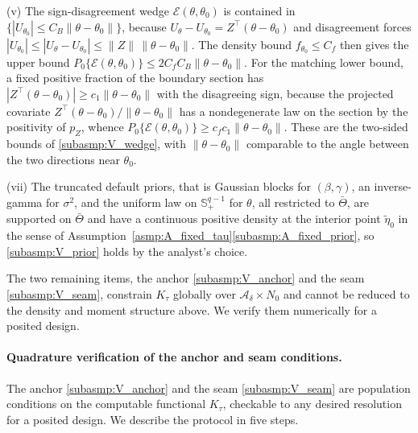 \documentclass[11pt]{article}
\theoremstyle{definition}
\theoremstyle{plain}
\begin{document}
(v) The sign-disagreement wedge $\mathcal E(\theta,\theta_0)$ is contained in $\{|U_{\theta_0}|\le C_B\|\theta-\theta_0\|\}$, because $U_\theta-U_{\theta_0}=Z^\top(\theta-\theta_0)$ and disagreement forces $|U_{\theta_0}|\le|U_\theta-U_{\theta_0}|\le\|Z\|\,\|\theta-\theta_0\|$. The density bound $f_{\theta_0}\le C_f$ then gives the upper bound $P_0\{\mathcal E(\theta,\theta_0)\}\le 2C_fC_B\|\theta-\theta_0\|$. For the matching lower bound, a fixed positive fraction of the boundary section has $|Z^\top(\theta-\theta_0)|\ge c_1\|\theta-\theta_0\|$ with the disagreeing sign, because the projected covariate $Z^\top(\theta-\theta_0)/\|\theta-\theta_0\|$ has a nondegenerate law on the section by the positivity of $p_Z$, whence $P_0\{\mathcal E(\theta,\theta_0)\}\ge c_f c_1\|\theta-\theta_0\|$. These are the two-sided bounds of \ref{subasmp:V_wedge}, with $\|\theta-\theta_0\|$ comparable to the angle between the two directions near $\theta_0$.

(vii) The truncated default priors, that is Gaussian blocks for $(\beta,\gamma)$, an inverse-gamma for $\sigma^2$, and the uniform law on $\mathbb S^{q-1}_+$ for $\theta$, all restricted to $\bar\Theta$, are supported on $\bar\Theta$ and have a continuous positive density at the interior point $\tilde\eta_0$ in the sense of Assumption~\ref{asmp:A_fixed_tau}\ref{subasmp:A_fixed_prior}, so \ref{subasmp:V_prior} holds by the analyst's choice.

The two remaining items, the anchor \ref{subasmp:V_anchor} and the seam \ref{subasmp:V_seam}, constrain $K_\tau$ globally over $\mathcal A_\delta\times N_0$ and cannot be reduced to the density and moment structure above. We verify them numerically for a posited design.

\paragraph{Quadrature verification of the anchor and seam conditions.} The anchor \ref{subasmp:V_anchor} and the seam \ref{subasmp:V_seam} are population conditions on the computable functional $K_\tau$, checkable to any desired resolution for a posited design. We describe the protocol in five steps.
\end{document}

